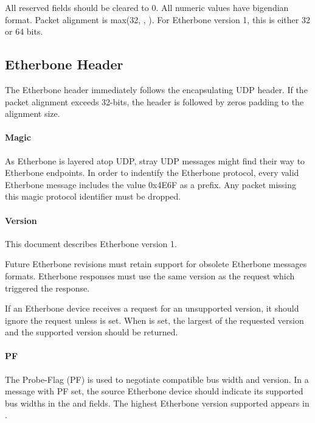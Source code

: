 \documentclass{article}
\begin{document}
All reserved fields should be cleared to 0.
All numeric values have bigendian format.
Packet alignment is max(32, , ).
For Etherbone version 1, this is either 32 or 64 bits.

\subsection{Etherbone Header}

The Etherbone header immediately follows the encapsulating UDP header.
If the packet alignment exceeds 32-bits, 
the header is followed by zeros padding to the alignment size.

\paragraph{Magic} \label{field:Magic}

As Etherbone is layered atop UDP, 
stray UDP messages might find their way to Etherbone endpoints.
In order to indentify the Etherbone protocol,
every valid Etherbone message includes the value 0x4E6F as a prefix.
Any packet missing this magic protocol identifier must be dropped.

\paragraph{Version} \label{field:Version}

This document describes Etherbone version 1.

Future Etherbone revisions must retain support for obsolete
Etherbone messages formats.
Etherbone responses must use the same version as the request
which triggered the response.

If an Etherbone device receives a request for an unsupported version,
it should ignore the request unless  is set.
When  is set, the largest of the requested version
and the supported version should be returned.

\paragraph{PF} \label{field:PF}

The Probe-Flag (PF) is used to negotiate compatible bus width and version.
In a message with PF set, the source Etherbone device should indicate its
supported bus widths in the 
 and  fields.
The highest Etherbone version supported appears in .
\end{document}
